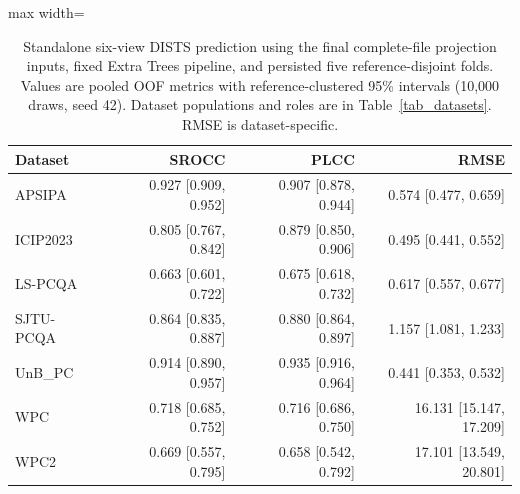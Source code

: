 \begin{table}[t!]
\centering
\caption{Standalone six-view DISTS prediction using the final complete-file projection inputs, fixed Extra Trees pipeline, and persisted five reference-disjoint folds. Values are pooled OOF metrics with reference-clustered 95\% intervals (10,000 draws, seed 42). Dataset populations and roles are in Table~\ref{tab_datasets}. RMSE is dataset-specific.}
\label{tab_review_projection_only}
\scriptsize
\begin{adjustbox}{max width=\textwidth}
\begin{tabular}{lrrr}
\toprule
Dataset & SROCC & PLCC & RMSE \\
\midrule
APSIPA & 0.927 [0.909, 0.952] & 0.907 [0.878, 0.944] & 0.574 [0.477, 0.659] \\
ICIP2023 & 0.805 [0.767, 0.842] & 0.879 [0.850, 0.906] & 0.495 [0.441, 0.552] \\
LS-PCQA & 0.663 [0.601, 0.722] & 0.675 [0.618, 0.732] & 0.617 [0.557, 0.677] \\
SJTU-PCQA & 0.864 [0.835, 0.887] & 0.880 [0.864, 0.897] & 1.157 [1.081, 1.233] \\
UnB\_PC & 0.914 [0.890, 0.957] & 0.935 [0.916, 0.964] & 0.441 [0.353, 0.532] \\
WPC & 0.718 [0.685, 0.752] & 0.716 [0.686, 0.750] & 16.131 [15.147, 17.209] \\
WPC2 & 0.669 [0.557, 0.795] & 0.658 [0.542, 0.792] & 17.101 [13.549, 20.801] \\
\bottomrule
\end{tabular}
\end{adjustbox}
\end{table}
